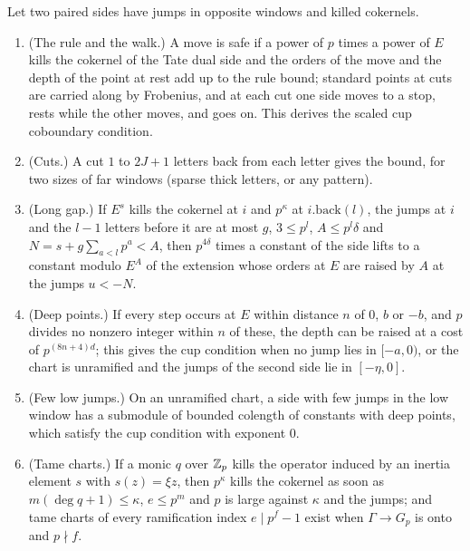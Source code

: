 \begin{proposition}[Walks]\label{prop:walks}
Let two paired sides have jumps in opposite windows and killed cokernels.
\begin{enumerate}[label=\textup{(\alph*)}]
\item (The rule and the walk.) A move is safe if a power of $p$ times a power of $E$ kills the cokernel of the Tate dual side and the orders of the move and the depth of the point at rest add up to the rule bound;
standard points at cuts are carried along by Frobenius, and at each cut one side moves to a stop, rests while the other moves, and goes on. This derives the scaled cup coboundary condition.
\item (Cuts.) A cut $1$ to $2J+1$ letters back from each letter gives the bound, for two sizes of far windows (sparse thick letters, or any pattern).
\item (Long gap.) If $E^s$ kills the cokernel at $i$ and $p^\kappa$ at $i.\mathrm{back}(l)$, the jumps at $i$ and the $l-1$ letters before it are at most $g$, $3\le p^l$, $A\le p^l\delta$ and $N=s+g\sum_{a<l}p^a<A$, then $p^{4\delta}$ times a constant of the side lifts to a constant modulo
$E^A$ of the extension whose orders at $E$ are raised by $A$ at the jumps $u<-N$.
\item (Deep points.) If every step occurs at $E$ within distance $n$ of $0$, $b$ or $-b$, and $p$ divides no nonzero integer within $n$ of these, the depth can be raised at a cost of $p^{(8n+4)d}$; this gives the cup condition when no jump
lies in $[-a,0)$, or the chart is unramified and the jumps of the second side lie in $[-\eta,0]$.
\item (Few low jumps.) On an unramified chart, a side with few jumps in the low window has a submodule of bounded colength of constants with deep points, which satisfy the cup condition with exponent $0$.
\item (Tame charts.) If a monic $q$ over $\mathbb{Z}_p$ kills the operator induced by an inertia element $s$ with $s(z)=\xi z$, then $p^\kappa$ kills the cokernel as soon as $m(\deg q+1)\le\kappa$, $e\le p^m$ and $p$ is large against $\kappa$ and the
jumps; and tame charts of every ramification index $e\mid p^f-1$ exist when $\Gamma\to G_p$ is onto and $p\nmid f$.
\end{enumerate}
\end{proposition}

